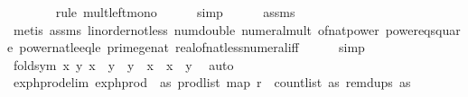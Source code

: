 \begin{isabellebody}
\ \ \ \ \ \ \isamarkupfalse%
\ {\isacharparenleft}{\kern0pt}rule\ mult{\isacharunderscore}{\kern0pt}left{\isacharunderscore}{\kern0pt}mono{\isacharparenright}{\kern0pt}\isanewline
\ \ \ \ \isamarkupfalse%
\ simp\isanewline
\ \ \ \ \isamarkupfalse%
\ assms{\isacharparenleft}{\kern0pt}{}{\isacharparenright}{\kern0pt}\ \isanewline
\ \ \ \ \ \ \ \isamarkupfalse%
\ {\isacharparenleft}{\kern0pt}metis\ assms{\isacharparenleft}{\kern0pt}{}{\isacharparenright}{\kern0pt}\ linorder{\isacharunderscore}{\kern0pt}not{\isacharunderscore}{\kern0pt}less\ num{\isacharunderscore}{\kern0pt}double\ numeral{\isacharunderscore}{\kern0pt}mult\ of{\isacharunderscore}{\kern0pt}nat{\isacharunderscore}{\kern0pt}power\ power{}{\isacharunderscore}{\kern0pt}eq{\isacharunderscore}{\kern0pt}square\ power{}{\isacharunderscore}{\kern0pt}nat{\isacharunderscore}{\kern0pt}le{\isacharunderscore}{\kern0pt}eq{\isacharunderscore}{\kern0pt}le\ prime{\isacharunderscore}{\kern0pt}ge{\isacharunderscore}{\kern0pt}{}{\isacharunderscore}{\kern0pt}nat\ real{\isacharunderscore}{\kern0pt}of{\isacharunderscore}{\kern0pt}nat{\isacharunderscore}{\kern0pt}less{\isacharunderscore}{\kern0pt}numeral{\isacharunderscore}{\kern0pt}iff{\isacharparenright}{\kern0pt}\isanewline
\ \ \ \ \isamarkupfalse%
\ simp{\isacharplus}{\kern0pt}\isanewline
\isanewline
\ \ \isamarkupfalse%
\ fold{\isacharunderscore}{\kern0pt}sym{\isacharcolon}{\kern0pt}\ {\isachardoublequoteopen}{\isasymAnd}x\ y{\isachardot}{\kern0pt}\ {\isacharparenleft}{\kern0pt}x\ {\isasymnoteq}\ y\ {\isasymand}\ y\ {\isasymnoteq}\ x{\isacharparenright}{\kern0pt}\ {\isacharequal}{\kern0pt}\ {\isacharparenleft}{\kern0pt}x\ {\isasymnoteq}\ y{\isacharparenright}{\kern0pt}{\isachardoublequoteclose}\ \isamarkupfalse%
\ auto\isanewline
\isanewline
\ \ \isamarkupfalse%
\ exp{\isacharunderscore}{\kern0pt}h{\isacharunderscore}{\kern0pt}prod{\isacharunderscore}{\kern0pt}elim{\isacharcolon}{\kern0pt}\ {\isachardoublequoteopen}exp{\isacharunderscore}{\kern0pt}h{\isacharunderscore}{\kern0pt}prod\ {\isacharequal}{\kern0pt}\ {\isacharparenleft}{\kern0pt}{\isasymlambda}as{\isachardot}{\kern0pt}\ prod{\isacharunderscore}{\kern0pt}list\ {\isacharparenleft}{\kern0pt}map\ {\isacharparenleft}{\kern0pt}r\ {\isasymcirc}\ count{\isacharunderscore}{\kern0pt}list\ as{\isacharparenright}{\kern0pt}\ {\isacharparenleft}{\kern0pt}remdups\ as{\isacharparenright}{\kern0pt}{\isacharparenright}{\kern0pt}{\isacharparenright}{\kern0pt}{\isachardoublequoteclose}\ \isanewline

\end{isabellebody}
